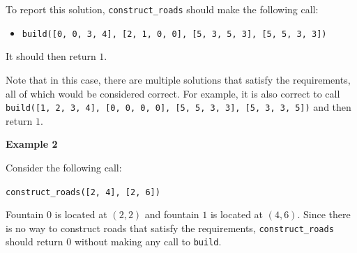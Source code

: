 To report this solution, \texttt{construct\_roads} should make the following call:
\begin{itemize}
\item \texttt{build([0, 0, 3, 4], [2, 1, 0, 0], [5, 3, 5, 3], [5, 5, 3, 3])}
\end{itemize}

It should then return $1$.

Note that in this case, there are multiple solutions that satisfy the requirements, all of which would be
considered correct. For example, it is also correct to call \texttt{build([1, 2, 3, 4], [0, 0, 0, 0], [5, 5, 3, 3], [5, 3, 3, 5])} and then return $1$.

\textbf{Example 2}

Consider the following call:

\texttt{construct\_roads([2, 4], [2, 6])}

Fountain $0$ is located at $(2,2)$ and fountain $1$ is located at $(4,6)$. Since there is no way to
construct roads that satisfy the requirements, \texttt{construct\_roads} should return $0$ without making any call to \texttt{build}.

